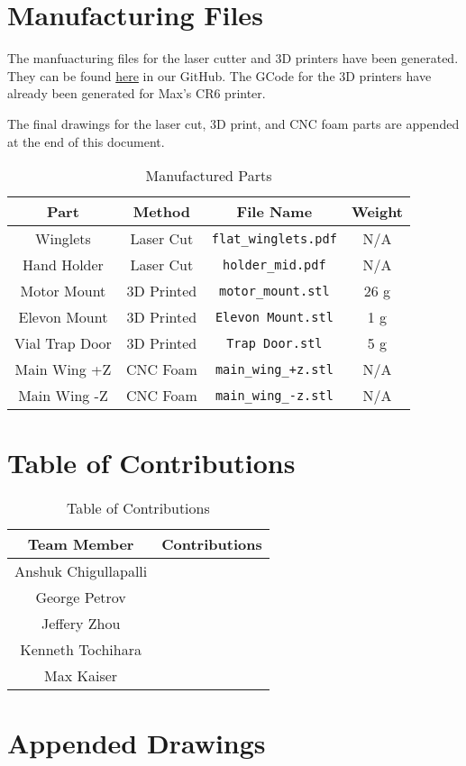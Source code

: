 \section{Manufacturing Files}
    
    The manfuacturing files for the laser cutter and 3D printers have been generated. They can be found \href{https://github.com/ktt3/ae484/tree/main/homeworks/homework6/manufacturing}{here} in our GitHub. The GCode for the 3D printers have already been generated for Max's CR6 printer.
    
    The final drawings for the laser cut, 3D print, and CNC foam parts are appended at the end of this document.

    \begin{table}[]
        \centering
        \caption{Manufactured Parts}
        \begin{tabular}{|c|c|c|c|}
            \hline
            \textbf{Part} & \textbf{Method} & \textbf{File Name} & \textbf{Weight} \\ \hline
            Winglets & Laser Cut & \verb|flat_winglets.pdf| & N/A \\ \hline
            Hand Holder & Laser Cut & \verb|holder_mid.pdf| & N/A \\ \hline
            Motor Mount & 3D Printed & \verb|motor_mount.stl| & 26 g \\ \hline
            Elevon Mount & 3D Printed & \verb|Elevon Mount.stl| & 1 g \\ \hline
            Vial Trap Door & 3D Printed & \verb|Trap Door.stl| & 5 g \\ \hline
            Main Wing +Z & CNC Foam & \verb|main_wing_+z.stl| & N/A \\ \hline
            Main Wing -Z & CNC Foam & \verb|main_wing_-z.stl| & N/A \\ \hline
        \end{tabular}
    \end{table}

\section{Table of Contributions}

    \begin{table}[H]
        \centering
        \caption{Table of Contributions}
        \label{tab:contributions}
        \begin{tabular}{|c|c|}
            \hline
            \textbf{Team Member} & \textbf{Contributions}  \\ \hline
            Anshuk Chigullapalli & \\ \hline
            George Petrov & \\ \hline
            Jeffery Zhou & \\ \hline
            Kenneth Tochihara & \\ \hline
            Max Kaiser & \\ \hline
        \end{tabular}
    \end{table}
    
\section*{Appended Drawings}


    
